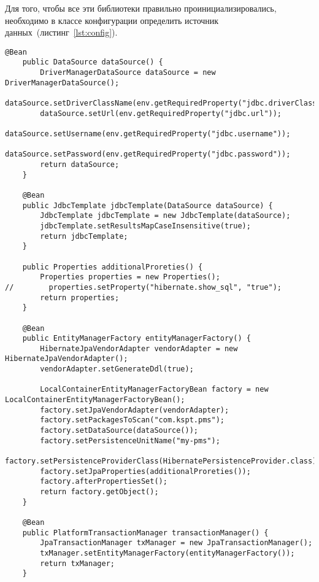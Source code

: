 Для того, чтобы все эти библиотеки правильно проинициализировались, необходимо в классе конфигурации определить источник данных~(листинг~\ref{lst:config}).
\begin{lstlisting}[style=crs_java, label={lst:config}, caption={Конфигурация источника данных}]
    @Bean
    public DataSource dataSource() {
        DriverManagerDataSource dataSource = new DriverManagerDataSource();
        dataSource.setDriverClassName(env.getRequiredProperty("jdbc.driverClassName"));
        dataSource.setUrl(env.getRequiredProperty("jdbc.url"));
        dataSource.setUsername(env.getRequiredProperty("jdbc.username"));
        dataSource.setPassword(env.getRequiredProperty("jdbc.password"));
        return dataSource;
    }

    @Bean
    public JdbcTemplate jdbcTemplate(DataSource dataSource) {
        JdbcTemplate jdbcTemplate = new JdbcTemplate(dataSource);
        jdbcTemplate.setResultsMapCaseInsensitive(true);
        return jdbcTemplate;
    }

    public Properties additionalProreties() {
        Properties properties = new Properties();
//        properties.setProperty("hibernate.show_sql", "true");
        return properties;
    }
    
    @Bean
    public EntityManagerFactory entityManagerFactory() {
        HibernateJpaVendorAdapter vendorAdapter = new HibernateJpaVendorAdapter();
        vendorAdapter.setGenerateDdl(true);

        LocalContainerEntityManagerFactoryBean factory = new LocalContainerEntityManagerFactoryBean();
        factory.setJpaVendorAdapter(vendorAdapter);
        factory.setPackagesToScan("com.kspt.pms");
        factory.setDataSource(dataSource());
        factory.setPersistenceUnitName("my-pms");
        factory.setPersistenceProviderClass(HibernatePersistenceProvider.class);
        factory.setJpaProperties(additionalProreties());
        factory.afterPropertiesSet();
        return factory.getObject();
    }

    @Bean
    public PlatformTransactionManager transactionManager() {
        JpaTransactionManager txManager = new JpaTransactionManager();
        txManager.setEntityManagerFactory(entityManagerFactory());
        return txManager;
    }
\end{lstlisting}


